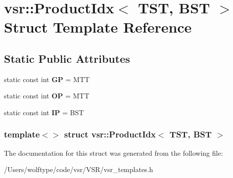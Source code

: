 \hypertarget{structvsr_1_1_product_idx_3_01_t_s_t_00_01_b_s_t_01_4}{\section{vsr\-:\-:Product\-Idx$<$ T\-S\-T, B\-S\-T $>$ Struct Template Reference}
\label{structvsr_1_1_product_idx_3_01_t_s_t_00_01_b_s_t_01_4}
}
\subsection*{Static Public Attributes}
\begin{DoxyCompactItemize}
\item 
\hypertarget{structvsr_1_1_product_idx_3_01_t_s_t_00_01_b_s_t_01_4_a4f3491f57527ca2cb40af9bca66c272c}{static const int {\bfseries G\-P} = M\-T\-T}\label{structvsr_1_1_product_idx_3_01_t_s_t_00_01_b_s_t_01_4_a4f3491f57527ca2cb40af9bca66c272c}

\item 
\hypertarget{structvsr_1_1_product_idx_3_01_t_s_t_00_01_b_s_t_01_4_a94fd0b4d4077e3c7d990b21211eb0110}{static const int {\bfseries O\-P} = M\-T\-T}\label{structvsr_1_1_product_idx_3_01_t_s_t_00_01_b_s_t_01_4_a94fd0b4d4077e3c7d990b21211eb0110}

\item 
\hypertarget{structvsr_1_1_product_idx_3_01_t_s_t_00_01_b_s_t_01_4_afb8e1a9802fbfc363aea136764329e81}{static const int {\bfseries I\-P} = B\-S\-T}\label{structvsr_1_1_product_idx_3_01_t_s_t_00_01_b_s_t_01_4_afb8e1a9802fbfc363aea136764329e81}

\end{DoxyCompactItemize}
\subsubsection*{template$<$$>$ struct vsr\-::\-Product\-Idx$<$ T\-S\-T, B\-S\-T $>$}



The documentation for this struct was generated from the following file\-:\begin{DoxyCompactItemize}
\item 
/\-Users/wolftype/code/vsr/\-V\-S\-R/vsr\-\_\-templates.\-h\end{DoxyCompactItemize}

